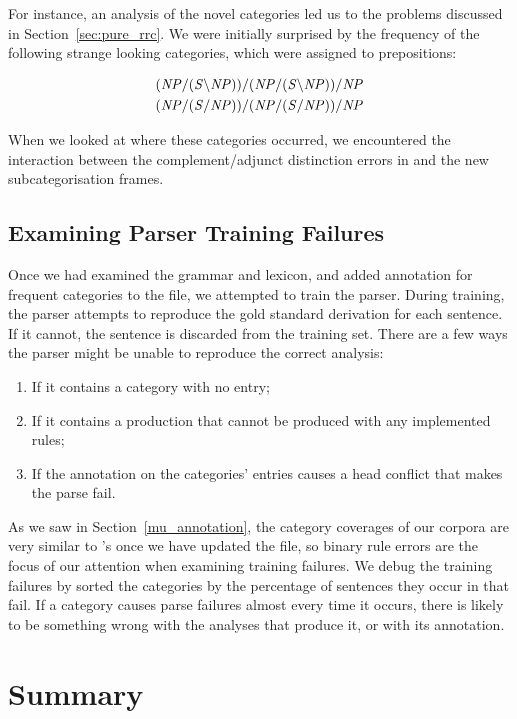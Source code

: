 For instance, an analysis of the novel categories led us to the problems
discussed in Section~\ref{sec:pure_rrc}. We were initially surprised by the
frequency of the following strange looking categories, which were assigned to
prepositions:

\begin{eqnarray}
 \mbox{$\it{(NP/(S\backslash NP))/(NP/(S\backslash NP))/NP}$}\\
 \mbox{$\it{(NP/(S/NP))/(NP/(S/NP))/NP}$}
\end{eqnarray}

When we looked at where these categories occurred, we encountered the
interaction between the complement\slash adjunct distinction errors in \ccgbank and
the new subcategorisation frames.

\subsection{Examining Parser Training Failures}


Once we had examined the grammar and lexicon, and added annotation for frequent
categories to the \markedup file, we attempted to train the parser. During
training, the \candc parser attempts to reproduce the gold standard \ccgbank
derivation for each sentence. If it cannot, the sentence is discarded from the
training set. There are a few ways the parser might be unable to reproduce the
correct analysis:

\begin{enumerate}
 \item If it contains a category with no \markedup entry;
 \item If it contains a production that cannot be produced with any implemented
rules;
 \item If the annotation on the categories' \markedup entries causes a head
conflict that makes the parse fail.
\end{enumerate}

As we saw in Section~\ref{mu_annotation}, the category coverages of our corpora
are very similar to \ccgbank's once we have updated the \markedup file, so
binary rule errors are the focus of our attention when examining training
failures. We debug the training failures by sorted the categories by the
percentage of sentences they occur in that fail. If a category causes parse
failures almost every time it occurs, there is likely to be something wrong with
the analyses that produce it, or with its \markedup annotation.

\section{Summary}

